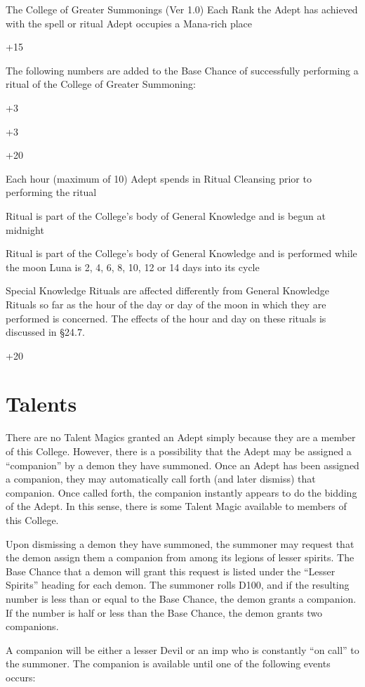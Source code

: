 \begin{Chapter}{The College of Greater Summonings (Ver 1.0)}
Each Rank the Adept has achieved with the spell or ritual Adept
occupies a Mana-rich place

+15 

The  following  numbers  are  added  to  the  Base 
Chance  of  successfully  performing  a  ritual  of  the 
College of Greater Summoning: 

+3 

+3 

+20 

Each hour (maximum of 10) Adept spends in 
Ritual Cleansing prior to performing the 
ritual 

Ritual is part of the College’s body of General Knowledge and is begun at midnight 

Ritual is part of the College’s body of General Knowledge and is performed while the 
moon Luna is 2, 4, 6, 8, 10, 12 or 14 days into its cycle 

Special Knowledge Rituals are affected differently 
from General Knowledge Rituals so far as the hour 
of  the  day  or  day  of  the  moon  in  which  they  are 
performed  is  concerned.  The  effects  of  the  hour 
and day on these rituals is discussed in §24.7. 

+20 

\section{Talents}

There are no Talent Magics granted an Adept simply because they are a
member of this College.  However, there is a possibility that the
Adept may be assigned a “companion” by a demon they have summoned.
Once an Adept has been assigned a companion, they may automatically
call forth (and later dismiss) that companion.  Once called forth, the
companion instantly appears to do the bidding of the Adept.  In this
sense, there is some Talent Magic available to members of this
College.

Upon dismissing a demon they have summoned, the summoner may request
that the demon assign them a companion from among its legions of
lesser spirits.  The Base Chance that a demon will grant this request
is listed under the “Lesser Spirits” heading for each demon.  The
summoner rolls D100, and if the resulting number is less than or equal
to the Base Chance, the demon grants a companion.  If the number is
half or less than the Base Chance, the demon grants two companions.

A companion will be either a lesser Devil or an imp who is constantly
“on call” to the summoner.  The companion is available until one of
the following events occurs:


\end{Chapter}
